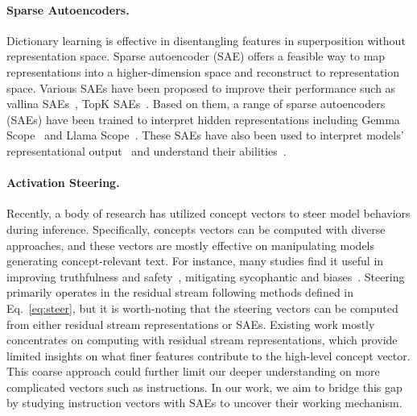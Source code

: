 \paragraph{Sparse Autoencoders.} Dictionary learning is effective in disentangling features in superposition without representation space. Sparse autoencoder (SAE) offers a feasible way to map representations into a higher-dimension space and reconstruct to representation space. Various SAEs have been proposed to improve their performance such as vallina SAEs~\cite{sharkey2022sae}, TopK SAEs~\cite{gao_scaling_2024}. Based on them, a range of sparse autoencoders (SAEs) have been trained to interpret hidden representations including Gemma Scope~\cite{lieberum2024gemma} and Llama Scope~\cite{he2024llama}. These SAEs have also been used to interpret models' representational output~\cite{kissane2024interpreting} and understand their abilities~\cite{ferrando2025do}.

\paragraph{Activation Steering.}
Recently, a body of research has utilized concept vectors to steer model behaviors during inference. Specifically, concepts vectors can be computed with diverse approaches, and these vectors are mostly effective on manipulating models generating concept-relevant text. For instance, many studies find it useful in improving truthfulness\cite{marks2023geometry} and safety~\cite{arditi2024refusal}, mitigating sycophantic and biases~\cite{zou2023representation}. Steering primarily operates in the residual stream following methods defined in Eq.~\eqref{eq:steer}, but it is worth-noting that the steering vectors can be computed from either residual stream representations or SAEs. Existing work mostly concentrates on computing with residual stream representations, which provide limited insights on what finer features contribute to the high-level concept vector. This coarse approach could further limit our deeper understanding on more complicated vectors such as instructions. In our work, we aim to bridge this gap by studying instruction vectors with SAEs to uncover their working mechanism.


